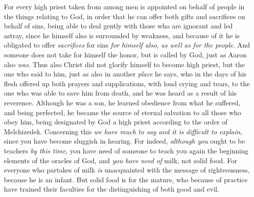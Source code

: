 \begin{biblechapter} %
 For every high priest taken from among men is appointed on behalf of people in the things relating to God, in order that he can offer both gifts and sacrifices on behalf of sins,
\verse being able to deal gently with those who are ignorant and led astray, since he himself also is surrounded by weakness,
\verse and because of it he is obligated to offer \textit{sacrifices} for sins \textit{for himself also, as well as for the people}.
\verse And someone does not take for himself the honor, but is called by God, just as Aaron also \textit{was}.
\verse Thus also Christ did not glorify himself to become high priest, but the one who said to him,
\verse just as also in another \textit{place} he says,
\verse who in the days of his flesh offered up both prayers and supplications, with loud crying and tears, to the one who was able to save him from death, and he was heard as a result of his reverence.
\verse Although he was a son, he learned obedience from what he suffered,
\verse and being perfected, he became the source of eternal salvation to all those who obey him,
\verse being designated by God a high priest according to the order of Melchizedek.
 Concerning this \textit{we have much to say and it is difficult to explain}, since you have become sluggish in hearing.
\verse For indeed, \textit{although you} ought to be teachers \textit{by this time}, you have need of someone to teach you again the beginning elements of the oracles of God, and \textit{you have need of} milk, not solid food.
\verse For everyone who partakes of milk \textit{is} unacquainted with the message of righteousness, because he is an infant.
\verse But solid food is for the mature, who because of practice have trained their faculties for the distinguishing of both good and evil.
\end{biblechapter}

